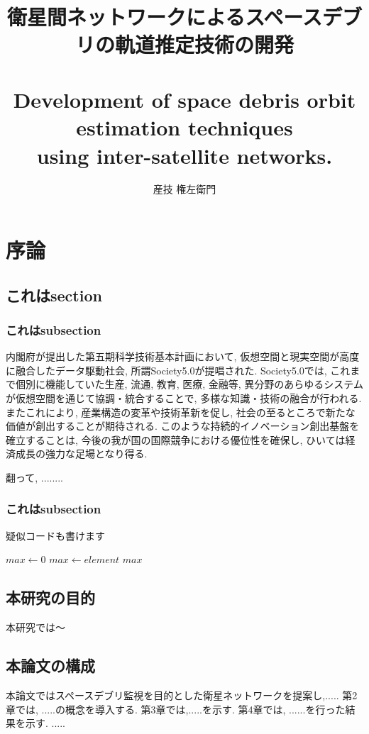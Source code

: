 \documentclass[10.5pt,a4j,dvipdfmx,openany]{jsbook}
\title{\LARGE\fbox{令和4年度 卒業論文}\\\mbox{}\\
  衛星間ネットワークによるスペースデブリの軌道推定技術の開発\\ \mbox{}\\
Development of space debris orbit estimation techniques\\using inter-satellite networks.}
\author{産技 権左衛門}
\begin{document}
\maketitle
\tableofcontents
\listoftables
\listoffigures
\clearpage
\chapter{序論}
\section{これはsection}
\label{背景}
\subsection*{これはsubsection}
内閣府が提出した第五期科学技術基本計画\cite{第五期科学技術基本計画}において, 
仮想空間と現実空間が高度に融合したデータ駆動社会, 所謂Society5.0が提唱された.
Society5.0では, 
これまで個別に機能していた生産, 流通, 教育, 医療, 金融等, 
異分野のあらゆるシステムが仮想空間を通じて協調・統合することで, 
多様な知識・技術の融合が行われる. 
またこれにより, 産業構造の変革や技術革新を促し, 
社会の至るところで新たな価値が創出することが期待される.
このような持続的イノベーション創出基盤を確立することは, 
今後の我が国の国際競争における優位性を確保し, ひいては経済成長の強力な足場となり得る.

翻って, ........
\subsection*{これはsubsection}
\begin{algorithm}[H]
  \caption{疑似コードも書けます}
  \begin{algorithmic}[1]
      \State $max \gets 0$
              \State $max \gets element$
          \EndIf
      \EndFor
      \State \Return $max$
  \EndFunction

  \end{algorithmic}
  \end{algorithm}
\section{本研究の目的}
本研究では〜
\section{本論文の構成}
本論文ではスペースデブリ監視を目的とした衛星ネットワークを提案し,.....
第2章では, .....の概念を導入する.
第3章では,.....を示す.
第4章では, ......を行った結果を示す.
.....
\end{document}

